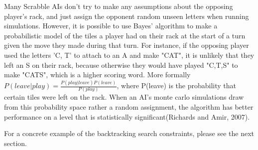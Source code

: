 \documentclass[12pt]{article}
\begin{document}
Many Scrabble AIs don't try to make any assumptions about the opposing
player's rack, and just assign the opponent random unseen letters when
running simulations. However, it is possible to use Bayes' algorithm
to make a probabilistic model of the tiles a player had on their rack
at the start of a turn given the move they made during that turn.%
For instance, if the opposing player used the letters 'C, T' to attach
to an A and make "CAT", it is unlikely that they left an S on their
rack, because otherwise they would have played "C,T,S" to make "CATS",
which is a higher scoring word. More formally $P(leave | play) =
\frac{P(play | leave)P(leave)}{P(play)}$, where P(leave) is the
probability that certain tiles were left on the rack. When an AI's
monte carlo simulations draw from this probability space rather a
random assignment, the algorithm has better performance on a level
that is statistically significant(Richards and Amir, 2007).

	



For a concrete example of the backtracking search constraints, please
see the next section.
\end{document}
